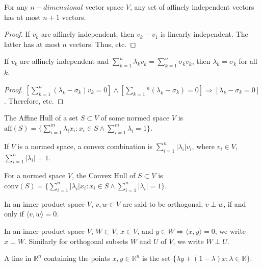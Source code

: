             \begin{theorem}
            For any $n-dimensional$ vector space $V$, any set of affinely independent vectors has at most $n+1$ vectors.
            \end{theorem}
            \begin{proof}
            If $v_k$ are affinely independent, then $v_k-v_1$ is linearly independent. The latter has at most $n$ vectors. Thus, etc.
            \end{proof}
            \begin{theorem}
            If $v_k$ are affinely independent and
            $\sum_{k=1}^{n}\lambda_{k}v_{k}=\sum_{k=1}^{n}\sigma_{k}v_{k}$,
            then $\lambda_{k}=\sigma_{k}$ for all $k$.
            \end{theorem}
            \begin{proof}
            $[\sum_{k=1}^{n}(\lambda_k - \sigma_k)v_k = 0]\land[\sum_{k=1}{^n}(\lambda_k-\sigma_k) = 0]\Rightarrow [\lambda_k-\sigma_k = 0]$. Therefore, etc.
            \end{proof}
            \begin{definition}
            The Affine Hull of a set $S\subset V$ of some normed space $V$ is $\textrm{aff}(S) = \{\sum_{i=1}^{m}\lambda_i x_i: x_i \in S\land \sum_{i=1}^{m}\lambda_i =1\}$.
            \end{definition}
            \begin{definition}
            If $V$ is a normed space, a convex combination is $\sum_{i=1}^{n}|\lambda_i| v_i$, where $v_i\in V$, $\sum_{i=1}^{n}|\lambda_i| = 1$.
            \end{definition}
            \begin{definition}
            For a normed space $V$, the Convex Hull of $S\subset V$ is $\textrm{conv}(S)=\{\sum_{i=1}^{n}|\lambda_i| x_i:x_i\in S\land \sum_{i=1}^{n} |\lambda_i| = 1 \}$.
            \end{definition}
            \begin{definition}
            In an inner product space $V$, $v,w\in V$ are said to be orthogonal, $v\perp w$, if and only if $\langle v,w \rangle = 0$.
            \end{definition}
            In an inner product space $V$, $W\subset V$, $x\in V$, and
            $y\in W \Rightarrow \langle x,y\rangle = 0$, we write $x\perp W$.
            Similarly for orthogonal subsets $W$ and $U$ of $V$, we write
            $W\perp U$.
            \begin{definition}
            A line in $\mathbb{R}^n$ containing the points $x,y\in \mathbb{R}^n$ is the set $\{\lambda y + (1-\lambda)x: \lambda \in \mathbb{R}\}$.
            \end{definition}
